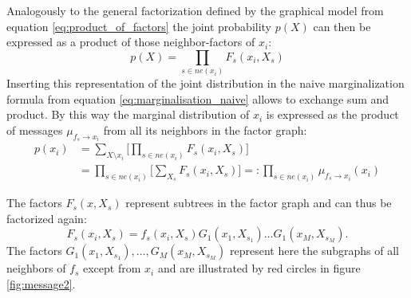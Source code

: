 \documentclass{sigkdd}
\begin{document}
Analogously to the general factorization defined by the graphical model from equation \ref{eq:product_of_factors} the joint probability $p(X)$ can then be expressed as a product of those neighbor-factors of $x_i$:
\begin{equation}\label{eq:product_of_neighbours}
p(X)= \prod_{s \in ne(x_i)} F_s(x_i, X_s)
\end{equation}
Inserting this representation of the joint distribution in the naive marginalization formula from equation \ref{eq:marginalisation_naive} allows to exchange sum and product. By this way the marginal distribution of $x_i$ is expressed as the product of messages $\mu_{f_s \rightarrow x_i}$ from all its neighbors in the factor graph:
\begin{equation}\label{eq:message1}
\begin{split}
p(x_i) &= \sum_{X \setminus x_i} \Big[ \prod_{s \in ne(x_i)} F_s(x_i, X_s) \Big] \\ &= \prod_{s \in ne(x_i)} \Big[ \sum_{X_s} F_s(x_i, X_s)\Big] =: \prod_{s \in ne(x_i)} \mu_{f_s \rightarrow x_i}(x_i)
\end{split}
\end{equation}

The factors $F_s(x,X_s)$ represent subtrees in the factor graph and can thus be factorized again: 
\begin{equation}\label{eq:product2}
F_s(x_i,X_s) = f_s(x_i, X_s) G_1(x_1, X_{s_1})\dots G_1(x_M, X_{s_M}).
\end{equation}
The factors $G_1(x_1, X_{s_1}),\dots , G_M(x_M, X_{s_M})$ represent here the subgraphs of all neighbors of $f_s$ except from $x_i$ and are illustrated by red circles in figure \ref{fig:message2}.
\end{document}
